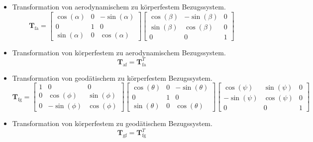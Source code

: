 \begin{itemize}
\item Transformation von aerodynamischem zu körperfestem Bezugssystem. 
\begin{equation}
\textbf{T}_\mathrm{fa} = \begin{bmatrix} 
\cos(\alpha) & 0& -\sin(\alpha)\\
0 & 1 & 0\\
\sin(\alpha)&  0& \cos(\alpha)
\end{bmatrix}\begin{bmatrix} 
\cos(\beta) & -\sin(\beta)& 0\\
\sin(\beta) & \cos(\beta) & 0\\
0&  0& 1
\end{bmatrix}
\end{equation}
\item Transformation von körperfestem zu aerodynamischem Bezugssystem. 
\begin{equation}
\textbf{T}_\mathrm{af} = \textbf{T}_\mathrm{fa}^T
\end{equation}
\item Transformation von geodätischem zu körperfestem Bezugssystem. 
\begin{equation}
\textbf{T}_\mathrm{fg} =\begin{bmatrix} 
1 & 0& 0\\
0 & \cos(\phi) & \sin(\phi)\\
0&  -\sin(\phi)& \cos(\phi)
\end{bmatrix} \begin{bmatrix} 
\cos(\theta) & 0& -\sin(\theta)\\
0 & 1 & 0\\
\sin(\theta)&  0& \cos(\theta)
\end{bmatrix}\begin{bmatrix} 
\cos(\psi) & \sin(\psi)& 0\\
-\sin(\psi) & \cos(\psi) & 0\\
0&  0& 1
\end{bmatrix}
\end{equation}
\item Transformation von körperfestem zu geodätischem Bezugssystem. 
\begin{equation}
\textbf{T}_\mathrm{gf} = \textbf{T}_\mathrm{fg}^T
\end{equation}
\end{itemize}

